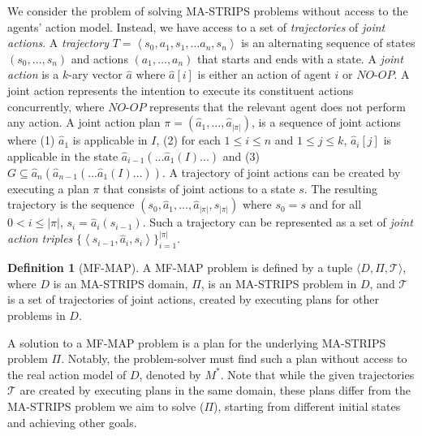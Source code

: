 \documentclass[letterpaper]{article} %
\theoremstyle{definition}
\newtheorem{definition}{Definition}
\theoremstyle{remark}
\newcommand{\tuple}[1]{\ensuremath{\left \langle #1 \right \rangle }}
\newcommand{\realm}{\ensuremath{M^*}\xspace}
\newcommand{\noop}{\textit{NO-OP}\xspace}
\newcommand{\mfmap}{\ac{MF-MAP}\xspace}
\begin{document}
We consider the problem of solving MA-STRIPS problems without access to the agents' action model. 
Instead, we have access to a set of \emph{trajectories} of \emph{joint actions}. 
A \emph{trajectory} $T=\tuple{s_0, a_1, s_1, \ldots a_n, s_n}$ is an alternating sequence of states $(s_0,\ldots,s_n)$ and actions $(a_1,\ldots,a_n)$ that starts and ends with a state.
A \emph{joint action} is a $k$-ary vector $\hat{a}$ where $\hat{a}[i]$ is either an action of agent $i$ or $\noop$. 
A joint action represents the intention to execute its constituent actions concurrently, where $\noop$ represents that the relevant agent does not perform any action. 
A joint action plan $\pi=(\hat{a}_1,\ldots,\hat{a}_{|\pi|})$, is a sequence of joint actions where (1) $\hat{a}_1$ is applicable in $I$, (2) for each $1 \leq i \leq n$ and $1 \leq j \leq k$, $\hat{a}_i[j]$ is applicable in the state $\hat{a}_{i-1}(...\hat{a}_1(I)...)$ and (3) $G\subseteq \hat{a}_n(\hat{a}_{n-1}(...\hat{a}_1(I)...))$.
A trajectory of joint actions can be created by executing a plan $\pi$ that consists of joint actions to a state $s$. 
The resulting trajectory is the sequence $(s_0, \hat{a}_1, \ldots, \hat{a}_{|\pi|}, s_{|\pi|})$ where $s_0=s$ and for all $0<i\leq |\pi|$, $s_i=\hat{a}_i(s_{i-1})$. 
Such a trajectory can be represented as a set of \emph{joint action triples} $\big\{\tuple{s_{i-1},\hat{a}_i,s_i}\big\}_{i=1}^{|\pi|}$.


\begin{definition}[\mfmap]
A \mfmap problem is defined by a tuple 
$\langle D, \Pi, \mathcal{T}\rangle$, where $D$ is an MA-STRIPS domain, $\Pi$, is an MA-STRIPS problem in $D$, and $\mathcal{T}$ is a set of trajectories of joint actions, created by executing plans for other problems in $D$. 
\end{definition}
A solution to a \mfmap problem is a plan for the underlying MA-STRIPS problem $\Pi$. Notably, the problem-solver must find such a plan without access to the real action model of $D$, denoted by \realm.  
Note that while the given trajectories $\mathcal{T}$ are created by executing plans in the same domain, these plans differ from the MA-STRIPS problem we aim to solve ($\Pi$), starting from different initial states and achieving other goals. 
\end{document}
